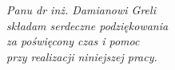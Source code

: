 \clearpage{\pagestyle{empty}\cleardoublepage}

\thispagestyle{empty}
\begin{flushright}
	\null
	\vfill
	\begin{minipage}{0.55\linewidth}
	{\large \textit{Panu dr inż. Damianowi Greli \\
		składam serdeczne podziękowania \\
		za poświęcony czas i pomoc \\
		przy realizacji niniejszej pracy.
	}}
	\end{minipage}
	\vspace{2cm}
\end{flushright}

\clearpage{\pagestyle{empty}\cleardoublepage}
